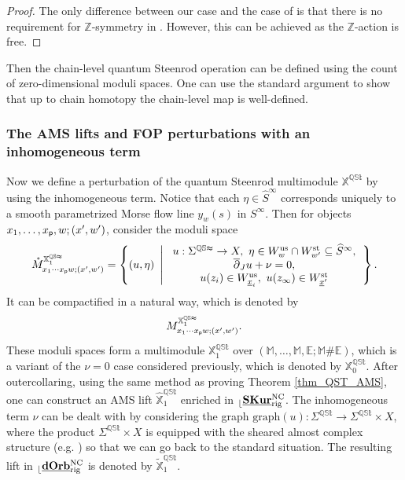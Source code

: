 \documentclass[reqno, 10pt]{amsart}
\numberwithin{equation}{section}
\numberwithin{equation}{section}
\renewcommand{\subset}{\subseteq}
\theoremstyle{definition}
\theoremstyle{remark}
\newcommand{\beqn}{\begin{equation*}}
\newcommand{\eeqn}{\end{equation*}}
\newcommand{\ov}{\overline}
\newcommand{\mb}{\mathbb}
\newcommand{\p}{{\sf p}}
\newcommand{\ep}{{{\mathbb E}}}
\renewcommand{\outer}{{}_{\lfloor}}
\newcommand{\wh}{\widehat}
\newcommand{\uds}[1]{\underline{\smash{#1}}}
\begin{document}
\begin{proof}
The only difference between our case and the case of \cite{Seidel_Wilkins_2022} is that there is no requirement for ${\mb Z}$-symmetry in \cite{Seidel_Wilkins_2022}. However, this can be achieved as the ${\mb Z}$-action is free. 
\end{proof}

Then the chain-level quantum Steenrod operation can be defined using the count of zero-dimensional moduli spaces. One can use the standard argument to show that up to chain homotopy the chain-level map is well-defined. 

\subsubsection{The AMS lifts and FOP perturbations with an inhomogeneous term}

Now we define a perturbation of the quantum Steenrod multimodule ${\mb X}^{\mb{QSt}}$ by using the inhomogeneous term. Notice that each $\eta \in \wh S^\infty$ corresponds uniquely to a smooth parametrized Morse flow line $y_w(s)$ in $S^\infty$. Then for objects $x_1, \ldots, x_\p, w; (x', w')$, consider the moduli space
\beqn
\mathring M_{x_1 \cdots x_\p w; (x', w')}^{\mb{X}_1^{\mb{QSt}}} = \left\{ (u, \eta)\ \left|\ \begin{array}{c}  u: \Sigma^{\mb{QSt}} \to X,\ \eta \in W^{\rm us}_{w} \cap W^{\rm st}_{w'} \subset \wh S^\infty,\\
\ov\partial_J u + \nu = 0,\\
u(z_i) \in W^{\rm us}_{\uds x_i},\ u(z_\infty) \in W^{\rm st}_{\uds x'}
\end{array}  \right. \right\}.
\eeqn
It can be compactified in a natural way, which is denoted by 
\beqn
M_{x_1 \cdots x_\p w; (x', w')}^{\mb{X}_1^{\mb{QSt}}}.
\eeqn
These moduli spaces form a multimodule ${\mb X}_1^{\mb{QSt}}$ over $({\mb M}, \ldots, \mb{M}, \ep; {\mb M} \# \ep)$, which is a variant of the $\nu = 0$ case considered previously, which is denoted by $\mb{X}_0^{\mb{QSt}}$. After outercollaring, using the same method as proving Theorem \ref{thm_QST_AMS}, one can construct an AMS lift $\hat{\mb X}_1^{\mb{QSt}}$ enriched in $\outer \uds{\bf SKur}_{\rm rig}^{\rm NC}$. The inhomogeneous term $\nu$ can be dealt with by considering the graph $\mathrm{graph}(u): \Sigma^{\mb{QSt}} \to \Sigma^{\mb{QSt}} \times X$, where the product $\Sigma^{\mb{QSt}} \times X$ is equipped with the sheared almost complex structure (e.g. \cite[Lemma 6.18]{AMS}) so that we can go back to the standard situation. The resulting lift in $\outer \uds{\bf dOrb}^{\rm NC}_{\rm rig}$ is denoted by $\tilde{\mb X}_1^{\mb{QSt}}$. 
\end{document}
